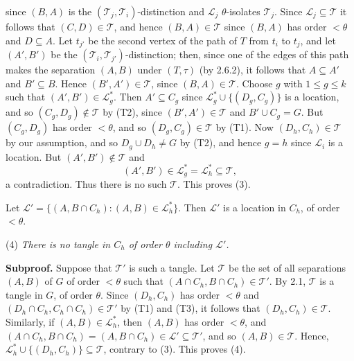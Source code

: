 \noindent since $(B, A)$ is the $(\mathscr{T}_j, \mathscr{T}_i)$-distinction and $\mathscr{L}_j$ $\theta$-isolates $\mathscr{T}_j$. Since $\mathscr{L}_j \subseteq \mathscr{T}$ it follows that $(C, D) \in \mathscr{T}$, and hence $(B, A) \in \mathscr{T}$ since $(B, A)$ has order $<\theta$ and $D \subseteq A$. Let $t_{j'}$ be the second vertex of the path of $T$ from $t_i$ to $t_j$, and let $(A', B')$ be the $(\mathscr{T}_i, \mathscr{T}_{j'})$-distinction; then, since one of the edges of this path makes the separation $(A, B)$ under $(T, \tau)$ (by 2.6.2), it follows that $A \subseteq A'$ and $B' \subseteq B$. Hence $(B', A') \in \mathscr{T}$, since $(B, A) \in \mathscr{T}$. Choose $g$ with $1 \le g \le k$ such that $(A', B') \in \mathscr{L}_g^*$. Then $A' \subseteq C_g$ since $\mathscr{L}_g^* \cup \{(D_g, C_g)\}$ is a location, and so $(C_g, D_g) \notin \mathscr{T}$ by (T2), since $(B', A') \in \mathscr{T}$ and $B' \cup C_g = G$. But $(C_g, D_g)$ has order $<\theta$, and so $(D_g, C_g) \in \mathscr{T}$ by (T1). Now $(D_h, C_h) \in \mathscr{T}$ by our assumption, and so $D_g \cup D_h \ne G$ by (T2), and hence $g = h$ since $\mathscr{L}_i$ is a location. But $(A', B') \notin \mathscr{T}$ and
\begin{equation*}
(A', B') \in \mathscr{L}_g^* = \mathscr{L}_h^* \subseteq \mathscr{T},
\end{equation*}
a contradiction. Thus there is no such $\mathscr{T}$. This proves (3).

Let $\mathscr{L}' = \{(A, B \cap C_h) \colon (A, B) \in \mathscr{L}_h^*\}$. Then $\mathscr{L}'$ is a location in $C_h$, of order $<\theta$.

\hspace*{12pt}(4) \textit{There is no tangle in $C_h$ of order $\theta$ including $\mathscr{L}'$.}

\textbf{Subproof.} Suppose that $\mathscr{T}'$ is such a tangle. Let $\mathscr{T}$ be the set of all separations $(A, B)$ of $G$ of order $<\theta$ such that $(A \cap C_h, B \cap C_h) \in \mathscr{T}'$. By 2.1, $\mathscr{T}$ is a tangle in $G$, of order $\theta$. Since $(D_h, C_h)$ has order $<\theta$ and $(D_h \cap C_h, C_h \cap C_h) \in \mathscr{T}'$ by (T1) and (T3), it follows that $(D_h, C_h) \in \mathscr{T}$. Similarly, if $(A, B) \in \mathscr{L}_h^*$, then $(A, B)$ has order $<\theta$, and $(A \cap C_h, B \cap C_h) = (A, B \cap C_h) \in \mathscr{L}' \subseteq \mathscr{T}'$, and so $(A, B) \in \mathscr{T}$. Hence, $\mathscr{L}_h^* \cup \{(D_h, C_h)\} \subseteq \mathscr{T}$, contrary to (3). This proves (4).

